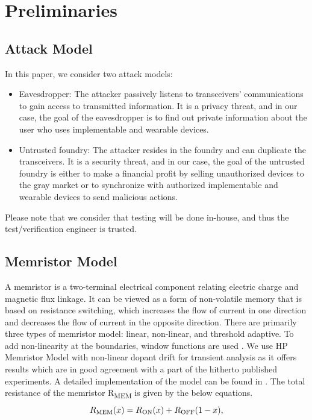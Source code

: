 \section*{Preliminaries}\label{prelim}


\subsection*{Attack Model}
In this paper, we consider two attack models:
\begin{itemize}
\item Eavesdropper: The attacker passively listens to transceivers' communications to gain access to transmitted information. It is a privacy threat, and in our case, the goal of the eavesdropper is to find out private information about the user who uses implementable and wearable devices. 
\item Untrusted foundry: The attacker resides in the foundry and can duplicate the transceivers. It is a security threat, and in our case, the goal of the untrusted foundry is either to make a financial profit by selling unauthorized devices to the gray market or to synchronize with authorized implementable and wearable devices to send malicious actions. 
\end{itemize}
Please note that we consider that testing will be done in-house, and thus the test/verification engineer is trusted.


\subsection*{Memristor Model}
A memristor is a two-terminal electrical component relating electric charge and magnetic flux linkage. It can be viewed as a form of non-volatile memory that is based on resistance switching, which increases the flow of current in one direction and decreases the flow of current in the opposite direction. There are primarily three types of memristor model: linear, non-linear, and threshold adaptive. To add non-linearity at the boundaries, window functions are used \cite{Joglekar-Memristor, 5934403}. We use HP Memristor Model with non-linear dopant drift for transient analysis as it offers results which are in good agreement with a part of the hitherto published experiments. A detailed implementation of the model can be found in \cite{biolek2009spice}. The total resistance of the memristor R\textsubscript{MEM} is given by the below equations.
\begin{equation}
R\textsubscript{MEM}(x) = R\textsubscript{ON} (x) + R\textsubscript{OFF} (1-x),
\end{equation}

